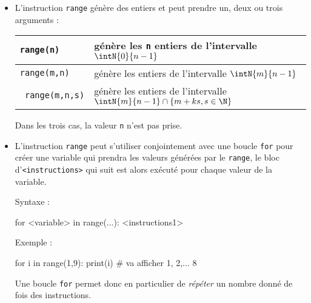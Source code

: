 \documentclass[11pt,a4paper]{article}
\begin{document}
\begin{tcolorbox}[left=0cm,title=\bf{\faPython \; Boucles {\tt for} avec {\tt range}},colbacktitle=cfond]
\begin{itemize}
	\item[\textbullet] L'instruction {\tt range} génère des entiers et peut prendre un, deux ou trois arguments :
	\begin{tabularx}{\linewidth}{|>{\tt}l|X|}
		\hline
		range(n) & génère les {\tt n} entiers de l'intervalle $\intN{0}{n-1}$ \\
		\hline
		range(m,n) & génère les entiers de l'intervalle $\intN{m}{n-1}$ \\
		\hline
		range(m,n,s) & génère les entiers de l'intervalle $\intN{m}{n-1} \cap \{m+ks, s \in \N\}$ \\
		\hline
	\end{tabularx}
	{\small \danger \;} Dans les trois cas, la valeur {\tt n} n'est pas prise.
	\item[\textbullet] L'instruction {\tt range} peut s'utiliser conjointement avec une boucle {\tt for} pour créer une variable qui prendra les valeurs générées par le {\tt range}, le bloc d'{\tt <instructions>} qui suit est alors exécuté pour chaque valeur de la variable.
	\setlength{\multicolsep}{0pt}
	\begin{multicols}{2}
		Syntaxe :
		\begin{python} 
for <variable> in range(...):
	<instructions1>
		\end{python} 
		Exemple : 
		\begin{python} 
for i in range(1,9):
	print(i) # va afficher 1, 2,... 8
		\end{python}
	\end{multicols}
Une boucle {\tt for} permet donc en particulier de \textit{répéter} un nombre donné de fois des instructions.
\end{itemize}
\end{tcolorbox}
\end{document}
